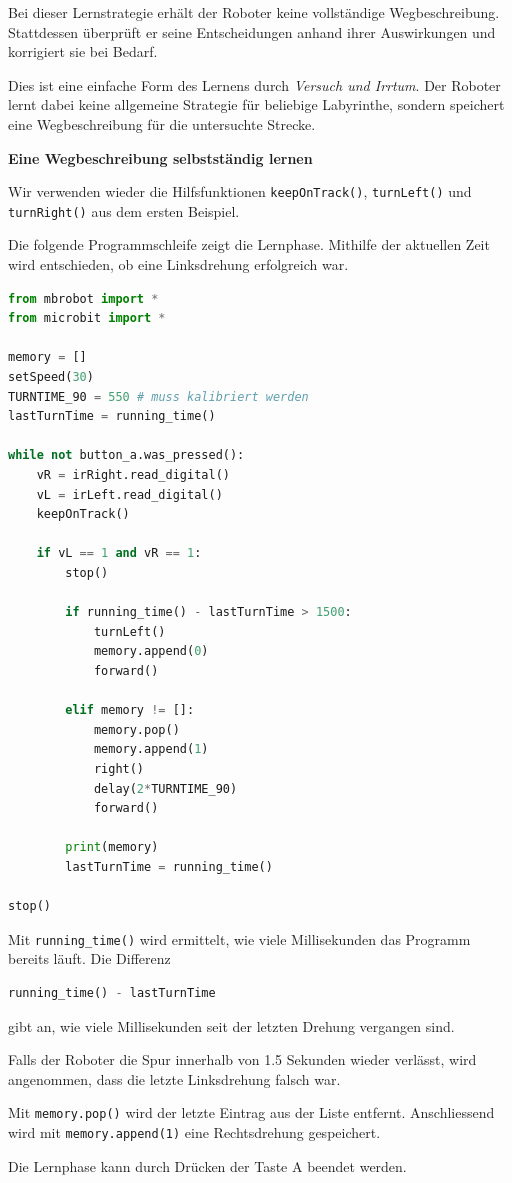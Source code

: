 \begin{myremark}
    Bei dieser Lernstrategie erhält der Roboter
    keine vollständige Wegbeschreibung. Stattdessen
    überprüft er seine Entscheidungen anhand ihrer
    Auswirkungen und korrigiert sie bei Bedarf.

    Dies ist eine einfache Form des Lernens durch
    \emph{Versuch und Irrtum}. Der Roboter lernt dabei
    keine allgemeine Strategie für beliebige Labyrinthe,
    sondern speichert eine Wegbeschreibung für
    die untersuchte Strecke.
\end{myremark}

\begin{myexample}
    \textbf{Eine Wegbeschreibung selbstständig lernen}

    Wir verwenden wieder die Hilfsfunktionen
    \texttt{keepOnTrack()}, \texttt{turnLeft()} und
    \texttt{turnRight()} aus dem ersten Beispiel.

    Die folgende Programmschleife zeigt die Lernphase.
    Mithilfe der aktuellen Zeit wird entschieden,
    ob eine Linksdrehung erfolgreich war.

    \begin{lstlisting}[language=Python]
from mbrobot import *
from microbit import *

memory = []
setSpeed(30)
TURNTIME_90 = 550 # muss kalibriert werden
lastTurnTime = running_time()

while not button_a.was_pressed():
    vR = irRight.read_digital()
    vL = irLeft.read_digital()
    keepOnTrack()

    if vL == 1 and vR == 1:
        stop()

        if running_time() - lastTurnTime > 1500:
            turnLeft()
            memory.append(0)
            forward()

        elif memory != []:
            memory.pop()
            memory.append(1)
            right()
            delay(2*TURNTIME_90)
            forward()

        print(memory)
        lastTurnTime = running_time()

stop()
    \end{lstlisting}

    Mit \texttt{running\_time()} wird ermittelt, wie viele
    Millisekunden das Programm bereits läuft. Die Differenz

    \begin{lstlisting}[language=Python]
running_time() - lastTurnTime
    \end{lstlisting}

    gibt an, wie viele Millisekunden seit der letzten
    Drehung vergangen sind.

    Falls der Roboter die Spur innerhalb von 1.5
    Sekunden wieder verlässt, wird angenommen,
    dass die letzte Linksdrehung falsch war.

    Mit \texttt{memory.pop()} wird der letzte Eintrag
    aus der Liste entfernt. Anschliessend wird mit
    \texttt{memory.append(1)} eine Rechtsdrehung
    gespeichert.

    Die Lernphase kann durch Drücken der Taste A
    beendet werden.
\end{myexample}


